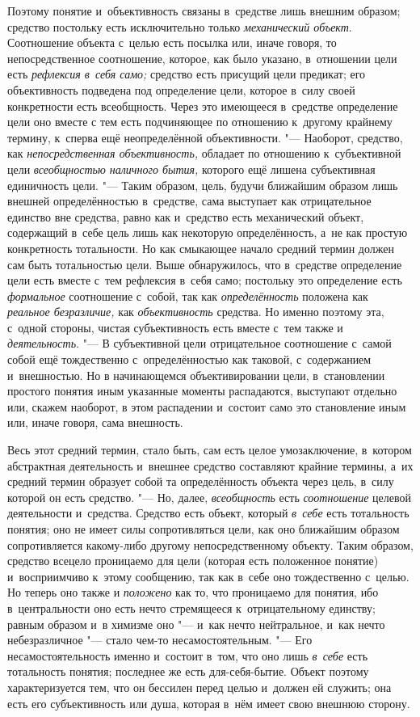 Поэтому понятие и~объективность связаны в~средстве лишь
внешним образом; средство постольку есть исключительно только
{\em механический объект}.
Соотношение объекта с~целью есть посылка или, иначе говоря,
то непосредственное соотношение, которое, как было указано, в~отношении
цели есть {\em рефлексия в~себя само;}
средство есть присущий цели предикат; его объективность
подведена под определение цели, которое в~силу своей конкретности есть
всеобщность. Через это имеющееся в~средстве определение цели оно вместе с
тем есть подчиняющее по отношению к~другому крайнему термину, к~сперва ещё
неопределённой объективности. "--- Наоборот, средство, как
{\em непосредственная объективность,}
обладает по отношению к~субъективной цели
{\em всеобщностью наличного бытия,}
которого ещё лишена субъективная единичность цели. "---
Таким образом, цель, будучи ближайшим образом лишь внешней
определённостью в~средстве, сама выступает как отрицательное единство вне
средства, равно как и~средство есть механический объект, содержащий в~себе
цель лишь как некоторую определённость, а~не как простую конкретность
тотальности. Но как смыкающее начало средний термин должен сам быть
тотальностью цели. Выше обнаружилось, что в~средстве определение цели есть
вместе с~тем рефлексия в~себя само; постольку это определение есть
{\em формальное}
соотношение с~собой, так как
{\em определённость}
положена как {\em реальное
безразличие,} как
{\em объективность}
средства. Но именно поэтому эта, с~одной стороны, чистая
субъективность есть вместе с~тем также и
{\em деятельность}. "--- В
субъективной цели отрицательное соотношение с~самой собой ещё тождественно
с~определённостью как таковой, с~содержанием и~внешностью. Но в
начинающемся объективировании цели, в~становлении простого понятия иным
указанные моменты распадаются, выступают отдельно или, скажем наоборот, в
этом распадении и~состоит само это становление иным или, иначе говоря, сама
внешность.

Весь этот средний термин, стало быть, сам есть целое
умозаключение, в~котором абстрактная деятельность и~внешнее средство
составляют крайние термины, а~их средний термин образует собой та
определённость объекта через цель, в~силу которой он есть средство. "---
Но, далее,
{\em всеобщность} есть
{\em соотношение} целевой
деятельности и~средства. Средство есть объект, который
{\em в~себе} есть
тотальность понятия; оно не имеет силы сопротивляться цели, как оно
ближайшим образом сопротивляется какому-либо другому непосредственному
объекту. Таким образом, средство всецело проницаемо для цели (которая есть
положенное понятие) и~восприимчиво к~этому сообщению, так как в~себе оно
тождественно с~целью. Но теперь оно также и
{\em положено} как то,
что проницаемо для понятия, ибо в~центральности оно есть нечто стремящееся
к~отрицательному единству; равным образом и~в химизме оно
"--- и~как нечто нейтральное, и~как нечто небезразличное
"--- стало чем-то несамостоятельным. "--- Его
несамостоятельность именно и~состоит в~том, что оно лишь
{\em в~себе} есть
тотальность понятия; последнее же есть для-себя-бытие. Объект поэтому
характеризуется тем, что он бессилен перед целью и~должен ей служить; она
есть его субъективность или душа, которая в~нём имеет свою внешнюю сторону.

